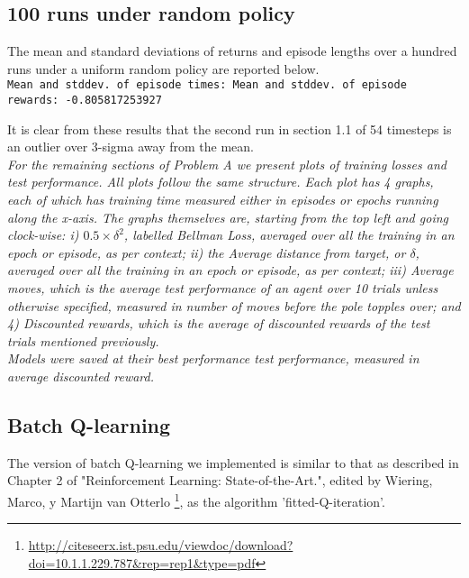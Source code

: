 \documentclass[paper=a4, fontsize=11pt]{scrartcl} %
\numberwithin{equation}{section} %
\numberwithin{figure}{section} %
\numberwithin{table}{section} %
\begin{document}
\subsection{100 runs under random policy}

The mean and standard deviations of returns and episode lengths over a hundred runs under a uniform random policy are reported below.\\

\texttt{Mean and stddev. of episode times: \quad\quad\quad\quad\quad{} \quad\quad{} \newline
Mean and stddev. of episode rewards: -0.805817253927 \quad\quad{} \newline
}

It is clear from these results that the second run in section 1.1 of 54 timesteps is an outlier over 3-sigma away from the mean.\\

\textit{For the remaining sections of Problem A we present plots of training losses and test performance. All plots follow the same structure. Each plot has 4 graphs, each of which has training time measured either in episodes or epochs running along the x-axis. The graphs themselves are, starting from the top left and going clock-wise: i) $0.5 \times \delta^2$, labelled Bellman Loss, averaged over all the training in an epoch or episode, as per context; ii) the Average distance from target, or $\delta$, averaged over all the training in an epoch or episode, as per context; iii) Average moves, which is the average test performance of an agent over 10 trials unless otherwise specified, measured in number of moves before the pole topples over; and 4) Discounted rewards, which is the average of discounted rewards of the test trials mentioned previously.\\
Models were saved at their best performance test performance, measured in average discounted reward.}
\newpage
\subsection{Batch Q-learning}

The version of batch Q-learning we implemented is similar to that as described in Chapter 2 of "Reinforcement Learning: State-of-the-Art.", edited by Wiering, Marco, y Martijn van Otterlo \footnote{\url{http://citeseerx.ist.psu.edu/viewdoc/download?doi=10.1.1.229.787&rep=rep1&type=pdf}}, as the algorithm 'fitted-Q-iteration'.\\
\end{document}
